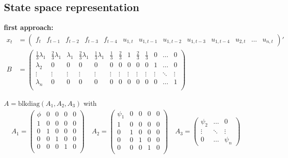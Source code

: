 \documentclass[12pt,a4paper]{scrartcl}
\begin{document}
\subsection{State space representation}

\textbf{first approach:}
\setcounter{MaxMatrixCols}{15} %
\begin{align*}
x_t &= \begin{pmatrix}
f_t & f_{t-1} & f_{t-2} & f_{t-3} & f_{t-4} & u_{1,t} & u_{1,t-1} & u_{1,t-2} & u_{1,t-3} & u_{1,t-4} & u_{2,t} & \dots & u_{n,t}
\end{pmatrix}' \\
B &= \begin{pmatrix}
\frac{1}{3}\lambda_1 & \frac{2}{3}\lambda_1 & \lambda_1 & \frac{2}{3}\lambda_1 & \frac{1}{3} \lambda_1 & \frac{1}{3} & \frac{2}{3} & 1 & \frac{2}{3} & \frac{1}{3} & 0 & \dots & 0\\
\lambda_2 & 0 & 0 & 0 & 0 & 0 & 0 & 0 & 0 & 0 & 1 & \dots & 0\\
\vdots & \vdots & \vdots & \vdots & \vdots & \vdots & \vdots & \vdots & \vdots & \vdots & \vdots & \ddots &  \vdots \\
\lambda_n & 0 & 0 & 0 & 0 & 0 & 0 & 0 & 0 & 0 & 0 & \dots & 1\\
\end{pmatrix}
\end{align*}

$A = \mathrm{blkdiag}(A_1, A_2, A_3)$ with
\begin{align*}
A_1 = \begin{pmatrix}
\phi & 0 & 0 & 0 & 0 \\
1 & 0 & 0 & 0 & 0 \\
0 & 1 & 0 & 0 & 0 \\
0 & 0 & 1 & 0 & 0 \\
0 & 0 & 0 & 1 & 0 \\
\end{pmatrix}  \quad
A_2 = \begin{pmatrix}
\psi_1 & 0 & 0 & 0 & 0 \\
1 & 0 & 0 & 0 & 0 \\
0 & 1 & 0 & 0 & 0 \\
0 & 0 & 1 & 0 & 0 \\
0 & 0 & 0 & 1 & 0 \\
\end{pmatrix} \quad
A_3 = \begin{pmatrix}
\psi_2 & \dots  & 0 \\ 
\vdots & \ddots & \vdots \\
0      & \dots  & \psi_n
\end{pmatrix}
\end{align*}
\end{document}
